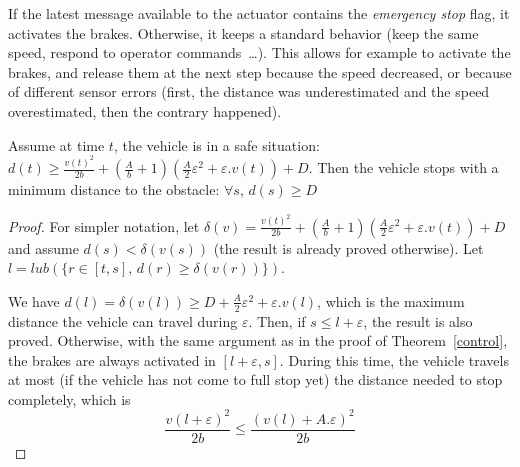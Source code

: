 If the latest message available to the actuator contains the \emph{emergency stop} flag, it activates the brakes. Otherwise, it keeps a standard behavior (keep the same speed, respond to operator commands~\dots).
This allows for example to activate the brakes, and release them at the next step because the speed decreased, or because of different sensor errors (first, the distance was underestimated and the speed overestimated, then the contrary happened).

\begin{thm}

Assume at time $t$, the vehicle is in a safe situation: $d(t) \geq \frac {v(t)^2} {2b} + \left(\frac A b + 1 \right) \left( \frac A 2 \varepsilon^2 + \varepsilon.v(t)\right) + D$.
Then the vehicle stops with a minimum distance to the obstacle: $\forall s, \, d(s) \geq D$
\end{thm}

\begin{proof}
For simpler notation, let $\delta(v) = \frac {v(t)^2} {2b} + \left(\frac A b + 1 \right) \left( \frac A 2 \varepsilon^2 + \varepsilon.v(t)\right) + D$ and assume $d(s) < \delta(v(s))$ (the result is already proved otherwise). Let $l = lub(\{r \in [t, s], \, d(r) \geq \delta(v(r))\})$.

We have $d(l) = \delta(v(l)) \geq D + \frac A 2 \varepsilon^2 + \varepsilon.v(l)$, which is the maximum distance the vehicle can travel during $\varepsilon$. Then, if $s \leq l + \varepsilon$, the result is also proved.
Otherwise, with the same argument as in the proof of Theorem~\ref{control}, the brakes are always activated in $[l + \varepsilon, s]$. During this time, the vehicle travels at most (if the vehicle has not come to full stop yet) the distance needed to stop completely, which is 
\[\frac {v(l + \varepsilon)^2} {2b} \leq \frac{(v(l) + A.\varepsilon)^2}{2b}\]
\end{proof}